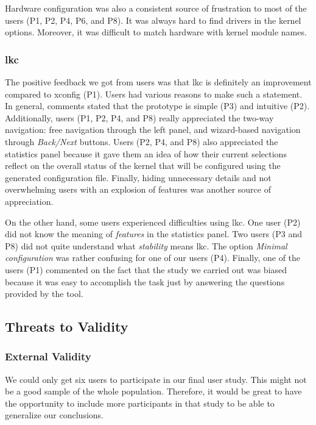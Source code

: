 \documentclass{chi2009}
\begin{document}
Hardware configuration was also a consistent source of frustration to most of the users (P1, P2, P4, P6, and P8). It was always hard to find drivers in the
kernel options. Moreover, it was difficult to match hardware with kernel module names.

\subsubsection{\textsf{lkc}}
The positive feedback we got from users was that \textsf{lkc} is definitely an improvement compared to \textsf{xconfig} (P1). Users had various reasons to
make such a statement. In general, comments stated that the prototype is simple (P3) and intuitive (P2). Additionally, users (P1, P2, P4, and P8) really
appreciated the two-way navigation: free navigation through the left panel, and wizard-based navigation through \textit{Back/Next} buttons. Users (P2, P4, and
P8) also appreciated the statistics panel because it gave them an idea of how their current selections reflect on the overall status of the kernel that will be
configured using the generated configuration file. Finally, hiding unnecessary details and not overwhelming users with an explosion of features was another
source of appreciation.

On the other hand, some users experienced difficulties using \textsf{lkc}. One user (P2) did not know the meaning of \textit{features} in the statistics panel.
Two users (P3 and P8) did not quite understand what \textit{stability} means \textsf{lkc}. The option \textit{Minimal configuration} was rather confusing for
one of our users (P4). Finally, one of the users (P1) commented on the fact that the study we carried out was biased because it was easy to accomplish the task
just by answering the questions provided by the tool.

\subsection{Threats to Validity}

\subsubsection{External Validity}
We could only get six users to participate in our final user study. This might not be a good sample of the whole population. Therefore, it would be great to
have the opportunity to include more participants in that study to be able to generalize our conclusions.
\end{document}
